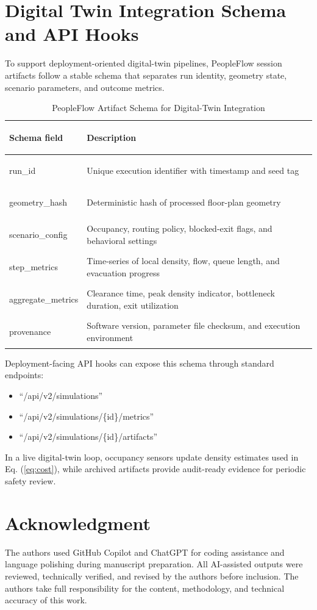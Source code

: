 \documentclass[nolineno]{ieeeaccess}
\begin{document}
\appendices
\section{Digital Twin Integration Schema and API Hooks}
To support deployment-oriented digital-twin pipelines, PeopleFlow session artifacts follow a stable schema that separates run identity, geometry state, scenario parameters, and outcome metrics.

\begin{table}[!htbp]
\centering
\caption{PeopleFlow Artifact Schema for Digital-Twin Integration}
\label{tab:dt_schema}
{\footnotesize
\setlength{\tabcolsep}{3pt}
\begin{tabular}{>{\bfseries\raggedright\arraybackslash}p{2.3cm} >{\raggedright\arraybackslash}p{4.4cm}}
\toprule
Schema field & Description \\
\midrule
run\_id & Unique execution identifier with timestamp and seed tag \\
geometry\_hash & Deterministic hash of processed floor-plan geometry \\
scenario\_config & Occupancy, routing policy, blocked-exit flags, and behavioral settings \\
step\_metrics & Time-series of local density, flow, queue length, and evacuation progress \\
aggregate\_metrics & Clearance time, peak density indicator, bottleneck duration, exit utilization \\
provenance & Software version, parameter file checksum, and execution environment \\
\bottomrule
\end{tabular}
}
\end{table}

Deployment-facing API hooks can expose this schema through standard endpoints:
\begin{itemize}
    \item ``/api/v2/simulations''
    \item ``/api/v2/simulations/\{id\}/metrics''
    \item ``/api/v2/simulations/\{id\}/artifacts''
\end{itemize}
In a live digital-twin loop, occupancy sensors update density estimates used in Eq. (\ref{eq:cost}), while archived artifacts provide audit-ready evidence for periodic safety review.

\clearpage
\section*{Acknowledgment}
The authors used GitHub Copilot and ChatGPT for coding assistance and language polishing during manuscript preparation. All AI-assisted outputs were reviewed, technically verified, and revised by the authors before inclusion. The authors take full responsibility for the content, methodology, and technical accuracy of this work.
\end{document}
